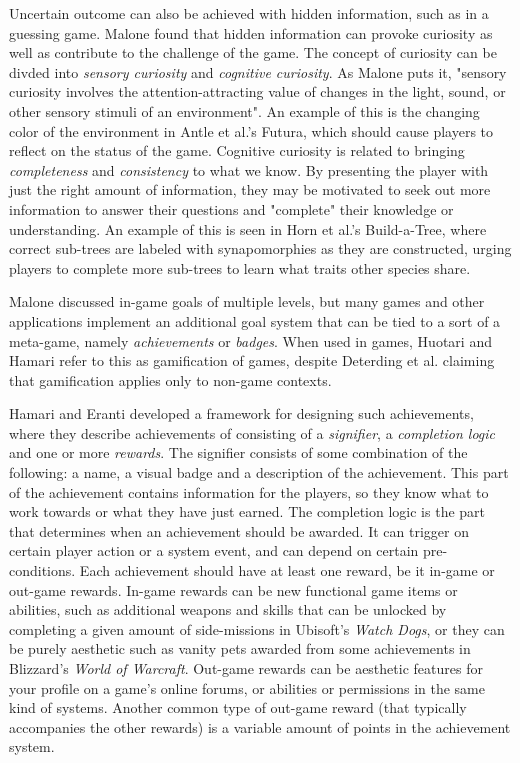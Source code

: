 Uncertain outcome can also be achieved with hidden information, such as in a guessing game. Malone found that hidden information can provoke curiosity as well as contribute to the challenge of the game. The concept of curiosity can be divded into \emph{sensory curiosity} and \emph{cognitive curiosity}. As Malone puts it, "sensory curiosity involves the attention-attracting value of changes in the light, sound, or other sensory stimuli of an environment". An example of this is the changing color of the environment in Antle et al.'s Futura, which should cause players to reflect on the status of the game. Cognitive curiosity is related to bringing \emph{completeness} and \emph{consistency} to what we know. By presenting the player with just the right amount of information, they may be motivated to seek out more information to answer their questions and "complete" their knowledge or understanding. An example of this is seen in Horn et al.'s Build-a-Tree, where correct sub-trees are labeled with synapomorphies as they are constructed, urging players to complete more sub-trees to learn what traits other species share.

Malone discussed in-game goals of multiple levels, but many games and other applications implement an additional goal system that can be tied to a sort of a meta-game, namely \emph{achievements} or \emph{badges}. When used in games, Huotari and Hamari\citep{Huotari} refer to this as gamification of games, despite Deterding et al. claiming that gamification applies only to non-game contexts.

Hamari and Eranti\citep{Hamari} developed a framework for designing such achievements, where they describe achievements of consisting of a \emph{signifier}, a \emph{completion logic} and one or more \emph{rewards}. The signifier consists of some combination of the following: a name, a visual badge and a description of the achievement. This part of the achievement contains information for the players, so they know what to work towards or what they have just earned. The completion logic is the part that determines when an achievement should be awarded. It can trigger on certain player action or a system event, and can depend on certain pre-conditions. Each achievement should have at least one reward, be it in-game or out-game rewards. In-game rewards can be new functional game items or abilities, such as additional weapons and skills that can be unlocked by completing a given amount of side-missions in Ubisoft's \emph{Watch Dogs}, or they can be purely aesthetic such as vanity pets awarded from some achievements in Blizzard's \emph{World of Warcraft}. Out-game rewards can be aesthetic features for your profile on a game's online forums, or abilities or permissions in the same kind of systems. Another common type of out-game reward (that typically accompanies the other rewards) is a variable amount of points in the achievement system.

